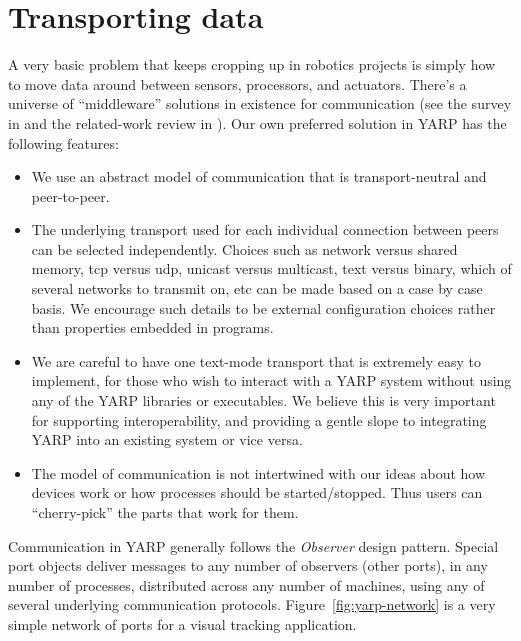 
\setlength{\doublerulesep}{\arrayrulewidth}



\section{Transporting data}

A very basic problem that keeps cropping up in robotics projects is
simply how to move data around between sensors, processors,
and actuators.  There's a universe of ``middleware'' solutions
in existence for communication (see the survey in \cite{kramer2007development}
and the related-work review in \cite{collett2005player}).
%
%
%
Our own preferred solution
in YARP has the following features:

\begin{itemize} \pflist

\item We use an abstract model of communication that is
transport-neutral and peer-to-peer.

\item The underlying transport used for each individual connection
between peers can be selected independently.  Choices such as network
versus shared memory, tcp versus udp, unicast versus multicast, text
versus binary, which of several networks to transmit on, etc can be
made based on a case by case basis.  We encourage such details to be
external configuration choices rather than properties embedded in
programs.

\item We are careful to have one text-mode transport that is
extremely easy to implement, for those who wish to interact with a
YARP system without using any of the YARP libraries or executables.
We believe this is very important for supporting interoperability, and
providing a gentle slope to integrating YARP into an existing system
or vice versa.

\item The model of communication is not intertwined with our
ideas about how devices work or how processes should be started/stopped.
Thus users can ``cherry-pick'' the parts that work for them.

\end{itemize}

Communication in YARP generally follows the {\it Observer} design
pattern. Special port objects deliver messages to any number of
observers (other ports), in any number of processes, distributed
across any number of machines, using any of several underlying
communication protocols. Figure~\ref{fig:yarp-network} is a very simple network of ports
for a visual tracking application.






